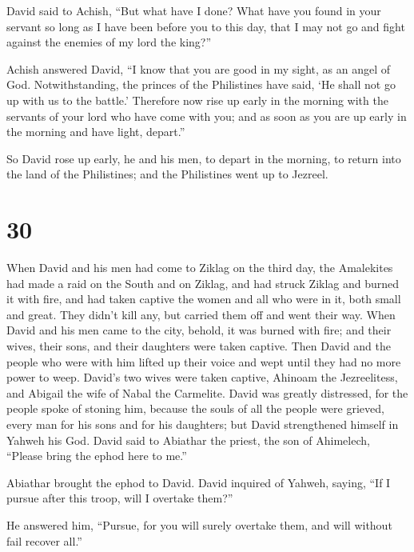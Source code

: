  David said to Achish, ``But what have I done? What have
you found in your servant so long as I have been before you to this day,
that I may not go and fight against the enemies of my lord the king?''

 Achish answered David, ``I know that you are good in my
sight, as an angel of God. Notwithstanding, the princes of the
Philistines have said, `He shall not go up with us to the battle.'
 Therefore now rise up early in the morning with the
servants of your lord who have come with you; and as soon as you are up
early in the morning and have light, depart.''

 So David rose up early, he and his men, to depart in the
morning, to return into the land of the Philistines; and the Philistines
went up to Jezreel.

\hypertarget{section-29}{%
\section{30}\label{section-29}}

 When David and his men had come to Ziklag on the third
day, the Amalekites had made a raid on the South and on Ziklag, and had
struck Ziklag and burned it with fire,  and had taken
captive the women and all who were in it, both small and great. They
didn't kill any, but carried them off and went their way. 
When David and his men came to the city, behold, it was burned with
fire; and their wives, their sons, and their daughters were taken
captive.  Then David and the people who were with him
lifted up their voice and wept until they had no more power to weep.
 David's two wives were taken captive, Ahinoam the
Jezreelitess, and Abigail the wife of Nabal the Carmelite.
 David was greatly distressed, for the people spoke of
stoning him, because the souls of all the people were grieved, every man
for his sons and for his daughters; but David strengthened himself in
Yahweh his God.  David said to Abiathar the priest, the
son of Ahimelech, ``Please bring the ephod here to me.''

Abiathar brought the ephod to David.  David inquired of
Yahweh, saying, ``If I pursue after this troop, will I overtake them?''

He answered him, ``Pursue, for you will surely overtake them, and will
without fail recover all.''

